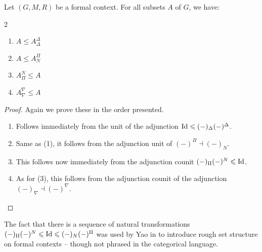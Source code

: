 \begin{proposition}
    \label{prop:closure-interior}
    Let $(G,M,R)$ be a formal context. For all subsets $A$ of $G$, we have: 
    \begin{multicols}{2}
    \begin{enumerate}
        \item $A\leq A^\Delta_\Delta$
        \item $A\leq A^\Pi_N$
        \item $A^N_\Pi \leq A$
        \item $A^\nabla_\nabla \leq A$
    \end{enumerate}
    \end{multicols}
\end{proposition}
\begin{proof}
    Again we prove these in the order presented. 
    \begin{enumerate}
        \item Follows immediately from the unit of the adjunction $\mathrm{Id} \leqslant (-)_\Delta (-)^\Delta$. 
        \item Same as (1), it follows from the adjunction unit of $(-)^\Pi \dashv (-)_N$. 
        \item This follows now immediately from the adjunction counit $(-)_\Pi (-)^N \leqslant \mathrm{Id}$. 
        \item As for (3), this follows from the adjunction counit of the adjunction $(-)_\nabla \dashv (-)^\nabla$. \qedhere
    \end{enumerate}
\end{proof}

\begin{remark}
    The fact that there is a sequence of natural transformations $(-)_\Pi (-)^N \leqslant \mathrm{Id} \leqslant (-)_N (-)^\Pi$ was used by Yao in \cite{yao_2004} to introduce rough set structure on formal contexts -- though not phrased in the categorical language.
\end{remark}


 




